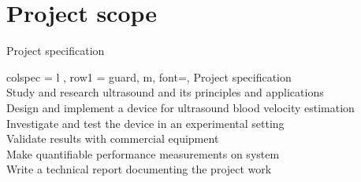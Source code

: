 \section{Project scope}

\begin{table}[htbp]
	\centering
	\caption{Project specification}
	\label{tab:specifications}
	\begin{tblr}[]{%
			colspec = {l
			},
			row{1} = {guard, m, font=\small\bfseries},
		}
		\toprule
		Project specification	\\
		\midrule
		Study and research ultrasound and its principles and applications	\\
		Design and implement a device for ultrasound blood velocity estimation	\\
		Investigate and test the device in an experimental setting		\\
		Validate results with commercial equipment 						\\
		Make quantifiable performance measurements on system			\\
		Write a technical report documenting the project work			\\ \bottomrule
	\end{tblr}
\end{table}

